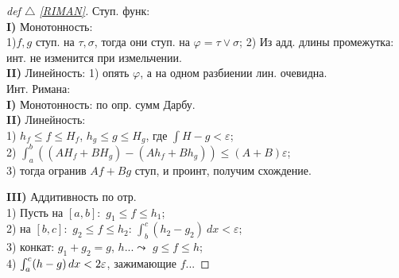 \begin{minipage}[]{0.45\textwidth}
\begin{proof}[
 def $\triangle$
\eqref{RIMAN}]

\phantom{42}
\noindent

Ступ. функ:\\
\textbf{I)} Монотонность:\\
1)$f, g$ ступ. на $\tau, \sigma$, тогда они ступ. на $\varphi = \tau \vee \sigma$; 
2) Из адд. длины промежутка: инт. не изменится при измельчении.\\
\textbf{II)} Линейность:
1) опять $\varphi$, а на одном разбиении лин. очевидна.\\

Инт. Римана:\\
\textbf{I)} Монотонность: по опр. сумм Дарбу.\\
\textbf{II)} Линейность:\\
1) $h_f \leq f \leq H_f$, $h_g \leq g \leq H_g$, где $\int H-g < \varepsilon$;\\
2) $\int_a^b ((A H_f + B H_g) - (A h_f + B h_g)) \leq (A+B) \varepsilon$;\\
3) тогда огранив $A f + B g$ ступ, и проинт, получим схождение.

\textbf{III)} Аддитивность по отр.\\
1) Пусть на $[a,b]:$ $g_1 \leq f \leq h_1$;\\
2) на $[b,c]:$ $g_2 \leq f \leq h_2$: $\int_b^c (h_2-g_2)\ d x < \varepsilon$;\\
3) конкат: $g_1 + g_2 = g$, $h... \leadsto$ $g\leq f \leq h$;\\
4) $\int_a^c (h - g) \, d x < 2 \varepsilon$, зажимающие $f$...

\end{proof}
\end{minipage}